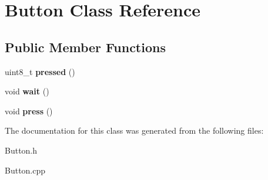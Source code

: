 \hypertarget{class_button}{}\section{Button Class Reference}
\label{class_button}
\subsection*{Public Member Functions}
\begin{DoxyCompactItemize}
\item 
\mbox{\label{class_button_a5aa424a69c7923ca5896c465d775bed1}} 
uint8\+\_\+t {\bfseries pressed} ()
\item 
\mbox{\label{class_button_a01e300b2b63ac4b3014aa5a9819d7366}} 
void {\bfseries wait} ()
\item 
\mbox{\label{class_button_af1464b95c6e43e125904b46670272ed2}} 
void {\bfseries press} ()
\end{DoxyCompactItemize}


The documentation for this class was generated from the following files\+:\begin{DoxyCompactItemize}
\item 
Button.\+h\item 
Button.\+cpp\end{DoxyCompactItemize}
